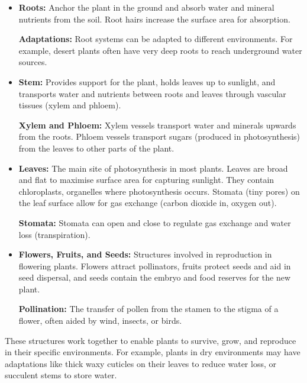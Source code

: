 \begin{itemize}
    \item \textbf{Roots:} Anchor the plant in the ground and absorb water and mineral nutrients from the soil. Root hairs increase the surface area for absorption.
    \begin{marginnote}
        \textbf{Adaptations:} Root systems can be adapted to different environments. For example, desert plants often have very deep roots to reach underground water sources.
    \end{marginnote}
    \item \textbf{Stem:} Provides support for the plant, holds leaves up to sunlight, and transports water and nutrients between roots and leaves through vascular tissues (xylem and phloem).
    \begin{marginnote}
        \textbf{Xylem and Phloem:} Xylem vessels transport water and minerals upwards from the roots. Phloem vessels transport sugars (produced in photosynthesis) from the leaves to other parts of the plant.
    \end{marginnote}
    \item \textbf{Leaves:} The main site of photosynthesis in most plants. Leaves are broad and flat to maximise surface area for capturing sunlight. They contain chloroplasts, organelles where photosynthesis occurs. Stomata (tiny pores) on the leaf surface allow for gas exchange (carbon dioxide in, oxygen out).
    \begin{marginnote}
        \textbf{Stomata:} Stomata can open and close to regulate gas exchange and water loss (transpiration).
    \end{marginnote}
    \item \textbf{Flowers, Fruits, and Seeds:} Structures involved in reproduction in flowering plants. Flowers attract pollinators, fruits protect seeds and aid in seed dispersal, and seeds contain the embryo and food reserves for the new plant.
    \begin{marginnote}
        \textbf{Pollination:} The transfer of pollen from the stamen to the stigma of a flower, often aided by wind, insects, or birds.
    \end{marginnote}
\end{itemize}

These structures work together to enable plants to survive, grow, and reproduce in their specific environments.  For example, plants in dry environments may have adaptations like thick waxy cuticles on their leaves to reduce water loss, or succulent stems to store water.

